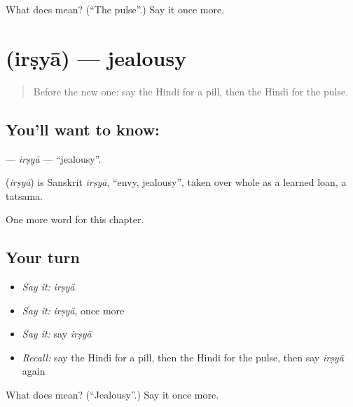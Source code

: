 \begin{tcolorbox}[breakable,colback=teal!4,colframe=teal!35!black,title={Before you move on}]
What does  mean? (\textquotedblleft{}The pulse\textquotedblright{}.) Say it once more.
\end{tcolorbox}
\section[\texorpdfstring{\hi{ईर्ष्या} (irṣyā)}{ईर्ष्या (irṣyā)}]{ (irṣyā) — jealousy}

\label{lesson:HI-C257-irsya}



\begin{quote}
Before the new one: say the Hindi for a pill, then the Hindi for the pulse.
\end{quote}

\subsection*{You'll want to know: }
\textbf{} — \emph{irṣyā} — \textquotedblleft{}jealousy\textquotedblright{}.

\begin{cousinweb}
\textbf{} (\emph{irṣyā}) is Sanskrit \emph{īrṣyā}, \textquotedblleft{}envy, jealousy\textquotedblright{}, taken over whole as a learned loan, a tatsama.
\end{cousinweb}

\begin{grammarlens}[title={What you've built}]
One more word for this chapter.
\end{grammarlens}

\subsection*{Your turn}
\begin{itemize}
\raggedright
  \item \emph{Say it:} \emph{irṣyā}
  \item \emph{Say it:} \emph{irṣyā}, once more
  \item \emph{Say it:} say \emph{irṣyā}
  \item \emph{Recall:} say the Hindi for a pill, then the Hindi for the pulse, then say \emph{irṣyā} again
\end{itemize}

\begin{tcolorbox}[breakable,colback=teal!4,colframe=teal!35!black,title={Before you move on}]
What does  mean? (\textquotedblleft{}Jealousy\textquotedblright{}.) Say it once more.
\end{tcolorbox}
